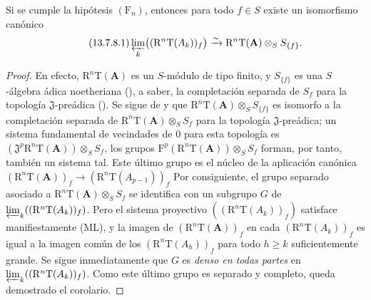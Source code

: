 \begin{corollary}[13.7.8]
\label{0.13.7.8}
\label{0.13.7.8-fr}
Si se cumple la hipótesis $(\mathrm F_n)$, entonces para todo $f\in S$
existe un isomorfismo canónico
\begin{equation}
\label{0.13.7.8.1-fr}
\tag{13.7.8.1}
\varprojlim_k\bigl((\mathrm R^n\mathrm T(A_k))_f\bigr)
\xrightarrow{\sim}\mathrm R^n\mathrm T(\mathbf A)\otimes_S S_{\{f\}}.
\end{equation}
\end{corollary}

\begin{proof}
En efecto, $\mathrm R^n\mathrm T(\mathbf A)$ es un $S$-módulo de tipo finito,
y $S_{\{f\}}$ es una $S$-álgebra ádica noetheriana
(), a saber, la completación separada
de $S_f$ para la topología $\mathfrak J$-preádica
().
Se sigue de  y
 que
$\mathrm R^n\mathrm T(\mathbf A)\otimes_S S_{\{f\}}$
es isomorfo a la completación separada de
$\mathrm R^n\mathrm T(\mathbf A)\otimes_S S_f$ para la
topología $\mathfrak J$-preádica; un sistema fundamental de vecindades de $0$ para esta topología es
$(\mathfrak J^p\mathrm R^n\mathrm T(\mathbf A))\otimes_S S_f$,
los grupos
$\mathrm F^p(\mathrm R^n\mathrm T(\mathbf A))\otimes_S S_f$
forman, por tanto, también un sistema tal.
Este último grupo es el núcleo de la aplicación canónica
$(\mathrm R^n\mathrm T(\mathbf A))_f\to
(\mathrm R^n\mathrm T(A_{p-1}))_f$
Por consiguiente, el grupo separado asociado a
$\mathrm R^n\mathrm T(\mathbf A)\otimes_S S_f$ se identifica con un subgrupo
$G$ de
$\varprojlim_k((\mathrm R^n\mathrm T(A_k))_f)$.
Pero el sistema proyectivo
$((\mathrm R^n\mathrm T(A_k))_f)$ satisface manifiestamente {\rm(ML)}, y la
imagen de $(\mathrm R^n\mathrm T(\mathbf A))_f$ en cada
$(\mathrm R^n\mathrm T(A_k))_f$ es igual a la imagen común de los
$(\mathrm R^n\mathrm T(A_h))_f$ para todo $h\geq k$ suficientemente grande.
Se sigue inmediatamente que $G$ es \emph{denso en todas partes} en
$\varprojlim_k((\mathrm R^n\mathrm T(A_k))_f)$.
Como este último grupo es separado y completo, queda demostrado el
corolario.
\end{proof}
